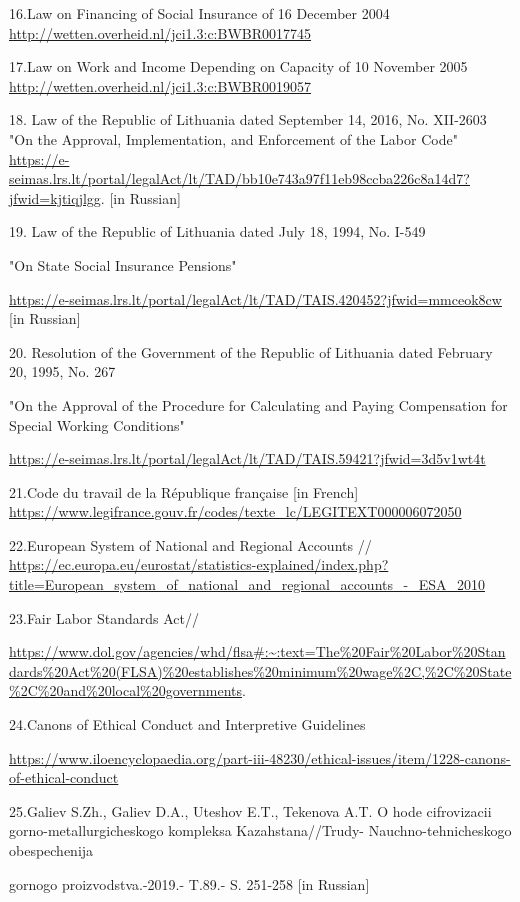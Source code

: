 16.Law on Financing of Social Insurance of 16 December 2004
\url{http://wetten.overheid.nl/jci1.3:c:BWBR0017745}

17.Law on Work and Income Depending on Capacity of 10 November 2005
\url{http://wetten.overheid.nl/jci1.3:c:BWBR0019057}

18. Law of the Republic of Lithuania dated September 14, 2016, No.
XII-2603 "On the Approval, Implementation, and Enforcement of the Labor
Code"
\url{https://e-seimas.lrs.lt/portal/legalAct/lt/TAD/bb10e743a97f11eb98ccba226c8a14d7?jfwid=kjtiqjlgg}.
{[}in Russian{]}

19. Law of the Republic of Lithuania dated July 18, 1994, No. I-549

"On State Social Insurance Pensions"

\url{https://e-seimas.lrs.lt/portal/legalAct/lt/TAD/TAIS.420452?jfwid=mmceok8cw}
{[}in Russian{]}

20. Resolution of the Government of the Republic of Lithuania dated
February 20, 1995, No. 267

"On the Approval of the Procedure for Calculating and Paying
Compensation for Special Working Conditions"

\url{https://e-seimas.lrs.lt/portal/legalAct/lt/TAD/TAIS.59421?jfwid=3d5v1wt4t}

21.Code du travail de la République française {[}in French{]}
\url{https://www.legifrance.gouv.fr/codes/texte_lc/LEGITEXT000006072050}

22.European System of National and Regional Accounts //
\url{https://ec.europa.eu/eurostat/statistics-explained/index.php?title=European_system_of_national_and_regional_accounts_-_ESA_2010}

23.Fair Labor Standards Act//

\url{https://www.dol.gov/agencies/whd/flsa\#:~:text=The\%20Fair\%20Labor\%20Standards\%20Act\%20(FLSA)\%20establishes\%20minimum\%20wage\%2C,\%2C\%20State\%2C\%20and\%20local\%20governments}.

24.Canons of Ethical Conduct and Interpretive Guidelines

\url{https://www.iloencyclopaedia.org/part-iii-48230/ethical-issues/item/1228-canons-of-ethical-conduct}

25.Galiev S.Zh., Galiev D.A., Uteshov E.T., Tekenova A.T. O hode
cifrovizacii gorno-metallurgicheskogo kompleksa Kazahstana//Trudy-
Nauchno-tehnicheskogo obespechenija

gornogo proizvodstva.-2019.- T.89.- S. 251-258 {[}in Russian{]}

